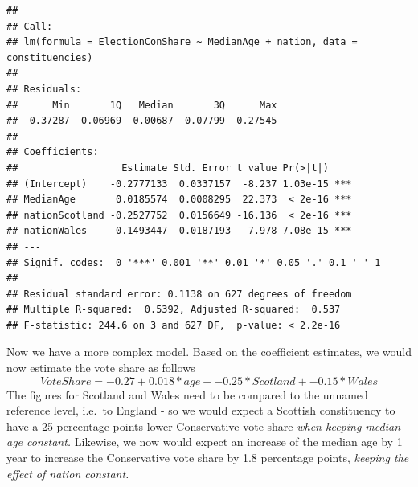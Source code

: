 \documentclass[
]{book}
\newenvironment{Shaded}{\begin{snugshade}}{\end{snugshade}}
\newcommand{\CommentTok}[1]{\textcolor[rgb]{0.56,0.35,0.01}{\textit{#1}}}
\newcommand{\DataTypeTok}[1]{\textcolor[rgb]{0.13,0.29,0.53}{#1}}
\newcommand{\KeywordTok}[1]{\textcolor[rgb]{0.13,0.29,0.53}{\textbf{#1}}}
\newcommand{\NormalTok}[1]{#1}
\newcommand{\OperatorTok}[1]{\textcolor[rgb]{0.81,0.36,0.00}{\textbf{#1}}}
\newcommand{\StringTok}[1]{\textcolor[rgb]{0.31,0.60,0.02}{#1}}
\begin{document}
\begin{Shaded}
\end{Shaded}

\begin{verbatim}
## 
## Call:
## lm(formula = ElectionConShare ~ MedianAge + nation, data = constituencies)
## 
## Residuals:
##      Min       1Q   Median       3Q      Max 
## -0.37287 -0.06969  0.00687  0.07799  0.27545 
## 
## Coefficients:
##                  Estimate Std. Error t value Pr(>|t|)    
## (Intercept)    -0.2777133  0.0337157  -8.237 1.03e-15 ***
## MedianAge       0.0185574  0.0008295  22.373  < 2e-16 ***
## nationScotland -0.2527752  0.0156649 -16.136  < 2e-16 ***
## nationWales    -0.1493447  0.0187193  -7.978 7.08e-15 ***
## ---
## Signif. codes:  0 '***' 0.001 '**' 0.01 '*' 0.05 '.' 0.1 ' ' 1
## 
## Residual standard error: 0.1138 on 627 degrees of freedom
## Multiple R-squared:  0.5392,	Adjusted R-squared:  0.537 
## F-statistic: 244.6 on 3 and 627 DF,  p-value: < 2.2e-16
\end{verbatim}

Now we have a more complex model. Based on the coefficient estimates, we
would now estimate the vote share as follows
\[VoteShare=-0.27 +  0.018*age + -0.25*Scotland + -0.15*Wales\] The
figures for Scotland and Wales need to be compared to the unnamed
reference level, i.e.~to England - so we would expect a Scottish
constituency to have a 25 percentage points lower Conservative vote
share \emph{when keeping median age constant.} Likewise, we now would expect
an increase of the median age by 1 year to increase the Conservative
vote share by 1.8 percentage points, \emph{keeping the effect of nation
constant.}
\end{document}
